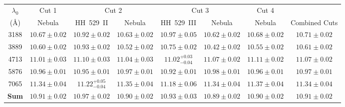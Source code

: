 \documentclass[fleqn,usenatbib]{mnras}
\begin{document}
\begin{table*}
\centering
\caption{He$^+$/H$^+$ abundances determined using He\thinspace I triplet lines highly affected by self-absorption. The row of ``sum'' is the result of adding the measured intensity of the triplets presented and redistributing it assuming negligible self-absorption effects ($\tau=0$).}
\label{tab:helium_2}
\begin{tabular}{cccccccc}
\hline 
$\lambda_0$ & \multicolumn{1}{c}{Cut 1} & \multicolumn{2}{c}{Cut 2} & \multicolumn{2}{c}{Cut 3} & \multicolumn{1}{c}{Cut 4} & \\
(\AA) &  Nebula & HH~529~II & Nebula & HH~529~III & Nebula & Nebula & Combined Cuts  \\
\hline 
3188 & $10.67 \pm 0.02$ & $10.92 \pm 0.02$ &  $10.63 \pm 0.02$ & $10.97 \pm 0.05$ & $10.62 \pm 0.02$ & $10.68 \pm 0.02$ & $10.71 \pm 0.02$  \\

3889 &$10.60 \pm 0.02 $& $10.93\pm 0.02$ &$10.52 \pm 0.02$& $10.75 \pm 0.02$ & $10.42 \pm 0.02$&$10.55\pm 0.02$&$10.61\pm 0.02$\\

4713 & $11.01 \pm 0.03$ & $11.10 \pm 0.03$  & $11.04 \pm 0.03$ & $11.02^{+0.03} _{-0.04}$  & $11.07 \pm 0.02$ & $11.11 \pm 0.02$ & $11.07 \pm 0.02$  \\

5876 & $10.96 \pm 0.01 $ & $10.95 \pm 0.01$ & $10.97 \pm 0.01 $ & $10.92 \pm 0.01$ & $10.98 \pm 0.01 $ & $10.96 \pm 0.01 $  & $10.97 \pm 0.01 $ \\

7065 &$11.34 \pm 0.04$& $11.22^{+0.05} _{-0.04}$ &$11.35\pm 0.04$& $11.18 \pm 0.06$  &$11.34 \pm 0.04$&$11.37 \pm 0.04$& $11.34 \pm 0.04$\\

\textbf{Sum} &\boldmath$10.91 \pm 0.02 $&\boldmath$10.97\pm 0.02 $&\boldmath$10.90 \pm 0.02 $ &\boldmath$10.93\pm 0.03  $ & \boldmath$10.89 \pm 0.02 $ &\boldmath$10.90 \pm 0.02$&\boldmath$10.91 \pm 0.02$\\

\hline
\end{tabular}
\end{table*}
\end{document}
